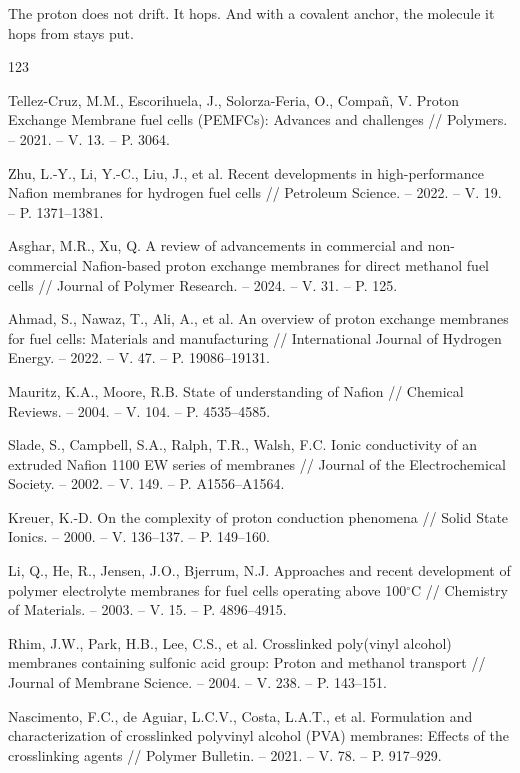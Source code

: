 \documentclass[12pt,a4paper]{report}
\begin{document}
The proton does not drift. It hops. And with a covalent 
anchor, the molecule it hops from stays put.

\begin{thebibliography}{123}

 Tellez-Cruz, M.M., Escorihuela, J., Solorza-Feria, O., Compañ, V. Proton Exchange Membrane fuel cells (PEMFCs): Advances and challenges // Polymers. – 2021. – V. 13. – P. 3064.

 Zhu, L.-Y., Li, Y.-C., Liu, J., et al. Recent developments in high-performance Nafion membranes for hydrogen fuel cells // Petroleum Science. – 2022. – V. 19. – P. 1371–1381.

 Asghar, M.R., Xu, Q. A review of advancements in commercial and non-commercial Nafion-based proton exchange membranes for direct methanol fuel cells // Journal of Polymer Research. – 2024. – V. 31. – P. 125.

 Ahmad, S., Nawaz, T., Ali, A., et al. An overview of proton exchange membranes for fuel cells: Materials and manufacturing // International Journal of Hydrogen Energy. – 2022. – V. 47. – P. 19086–19131.

 Mauritz, K.A., Moore, R.B. State of understanding of Nafion // Chemical Reviews. – 2004. – V. 104. – P. 4535–4585.

 Slade, S., Campbell, S.A., Ralph, T.R., Walsh, F.C. Ionic conductivity of an extruded Nafion 1100 EW series of membranes // Journal of the Electrochemical Society. – 2002. – V. 149. – P. A1556–A1564.

 Kreuer, K.-D. On the complexity of proton conduction phenomena // Solid State Ionics. – 2000. – V. 136–137. – P. 149–160.

 Li, Q., He, R., Jensen, J.O., Bjerrum, N.J. Approaches and recent development of polymer electrolyte membranes for fuel cells operating above 100\(^\circ\)C // Chemistry of Materials. – 2003. – V. 15. – P. 4896–4915.

 Rhim, J.W., Park, H.B., Lee, C.S., et al. Crosslinked poly(vinyl alcohol) membranes containing sulfonic acid group: Proton and methanol transport // Journal of Membrane Science. – 2004. – V. 238. – P. 143–151.

 Nascimento, F.C., de Aguiar, L.C.V., Costa, L.A.T., et al. Formulation and characterization of crosslinked polyvinyl alcohol (PVA) membranes: Effects of the crosslinking agents // Polymer Bulletin. – 2021. – V. 78. – P. 917–929.


\end{thebibliography}
\end{document}
